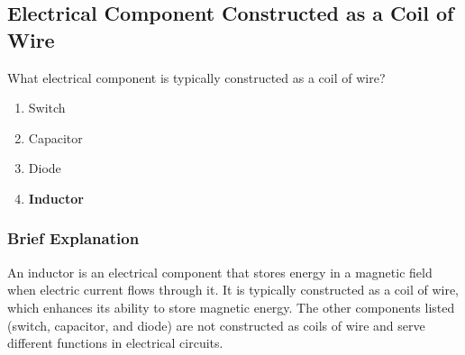 \subsection{Electrical Component Constructed as a Coil of Wire}
\label{T6A07}

\begin{tcolorbox}[colback=gray!10!white,colframe=black!75!black,title=T6A07]
What electrical component is typically constructed as a coil of wire?
\begin{enumerate}[noitemsep]
    \item Switch
    \item Capacitor
    \item Diode
    \item \textbf{Inductor}
\end{enumerate}
\end{tcolorbox}

\subsubsection*{Brief Explanation}
An inductor is an electrical component that stores energy in a magnetic field when electric current flows through it. It is typically constructed as a coil of wire, which enhances its ability to store magnetic energy. The other components listed (switch, capacitor, and diode) are not constructed as coils of wire and serve different functions in electrical circuits.